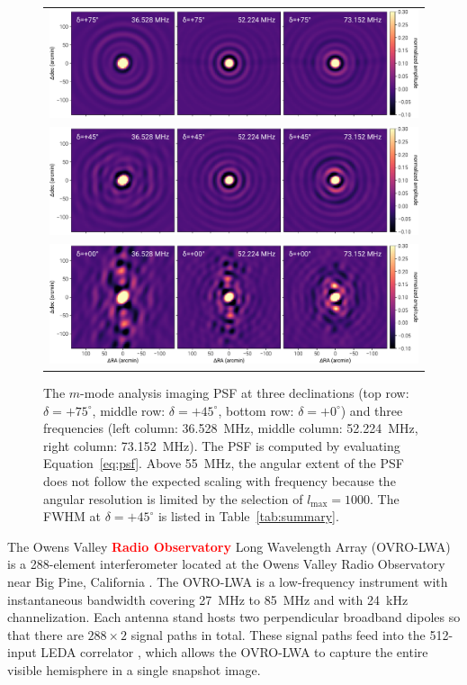 \documentclass[twocolumn]{aastex61}
\newcommand{\revision}[1]{\textcolor{red}{\textbf{#1}}}
\begin{document}
\begin{figure}[t]
    \begin{tabular}{c}
        \includegraphics[width=\textwidth]{figures/psf/psf+75} \\
        \includegraphics[width=\textwidth]{figures/psf/psf+45} \\
        \includegraphics[width=\textwidth]{figures/psf/psf+0} \\
    \end{tabular}
    \caption{
        The $m$-mode analysis imaging PSF at three declinations (top row: $\delta=+75^\circ$, middle
        row: $\delta=+45^\circ$, bottom row: $\delta=+0^\circ$) and three frequencies (left column:
        36.528~MHz, middle column: 52.224~MHz, right column: 73.152~MHz).  The PSF is computed by
        evaluating Equation~\ref{eq:psf}. Above 55~MHz, the angular extent of the PSF does not
        follow the expected scaling with frequency because the angular resolution is limited by the
        selection of $l_\text{max}=1000$. The FWHM at $\delta=+45^\circ$ is listed in
        Table~\ref{tab:summary}.
    }
    \label{fig:psf}
\end{figure}

The Owens Valley \revision{Radio Observatory} Long Wavelength Array (OVRO-LWA) is a 288-element
interferometer located at the Owens Valley Radio Observatory near Big Pine, California
\citep{hallinan_2017}.  The OVRO-LWA is a low-frequency instrument with instantaneous bandwidth
covering 27~MHz to 85~MHz and with 24~kHz channelization.  Each antenna stand hosts two
perpendicular broadband dipoles so that there are $288\times2$ signal paths in total. These signal
paths feed into the 512-input LEDA correlator \citep{2015JAI.....450003K}, which allows the OVRO-LWA
to capture the entire visible hemisphere in a single snapshot image.
\end{document}
